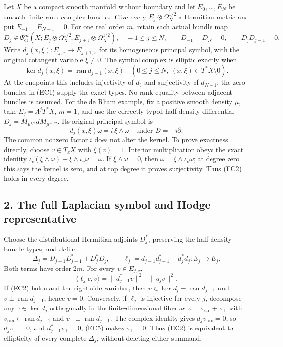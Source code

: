 \documentclass[
  11pt,
]{article}
\begin{document}
Let \(X\) be a compact smooth manifold without boundary and let
\(E_0,\ldots,E_N\) be smooth finite-rank complex bundles. Give every
\(E_j\otimes\Omega_X^{1/2}\) a Hermitian metric and put
\(E_{-1}=E_{N+1}=0\). For one real order \(m\), retain each actual
bundle map \[
 D_j\in\Psi^m_{\mathrm{cl}}
   (X;E_j\otimes\Omega_X^{1/2},E_{j+1}\otimes\Omega_X^{1/2}),
 \quad -1\le j\le N,\qquad
 D_{-1}=D_N=0,\qquad D_jD_{j-1}=0.
 \tag{EC1}
\] Write \(d_j(x,\xi):E_{j,x}\to E_{j+1,x}\) for its homogeneous
principal symbol, with the original cotangent variable \(\xi\ne0\). The
symbol complex is elliptic exactly when \[
 \ker d_j(x,\xi)=\operatorname{ran}d_{j-1}(x,\xi)
 \quad(0\le j\le N,\ (x,\xi)\in T^*X\setminus0).
 \tag{EC2}
\] At the endpoints this includes injectivity of \(d_0\) and
surjectivity of \(d_{N-1}\); the zero bundles in (EC1) supply the exact
types. No rank equality between adjacent bundles is assumed. For the de
Rham example, fix a positive smooth density \(\mu\), take
\(E_j=\Lambda^jT^*X\), \(m=1\), and use the correctly typed half-density
differential \(D_j=M_{\mu^{1/2}}dM_{\mu^{-1/2}}\). Its original
principal symbol is \[
 d_j(x,\xi)\omega=i\,\xi\wedge\omega
 \quad\text{under }D=-i\partial.
 \tag{EC3}
\] The common nonzero factor \(i\) does not alter the kernel. To prove
exactness directly, choose \(v\in T_xX\) with \(\xi(v)=1\). Interior
multiplication obeys the exact identity
\(\iota_v(\xi\wedge\omega)+\xi\wedge\iota_v\omega=\omega\). If
\(\xi\wedge\omega=0\), then \(\omega=\xi\wedge\iota_v\omega\); at degree
zero this says the kernel is zero, and at top degree it proves
surjectivity. Thus (EC2) holds in every degree.

\subsection{2. The full Laplacian symbol and Hodge
representative}\label{the-full-laplacian-symbol-and-hodge-representative}

Choose the distributional Hermitian adjoints \(D_j^*\), preserving the
half-density bundle types, and define \[
 \Delta_j=D_{j-1}D_{j-1}^*+D_j^*D_j,\qquad
 \ell_j=d_{j-1}d_{j-1}^*+d_j^*d_j
       :E_j\longrightarrow E_j.
 \tag{EC4}
\] Both terms have order \(2m\). For every \(v\in E_{j,x}\), \[
 \langle\ell_jv,v\rangle
   =\|d_{j-1}^*v\|^2+\|d_jv\|^2.
 \tag{EC5}
\] If (EC2) holds and the right side vanishes, then \(v\in\ker d_j
=\operatorname{ran}d_{j-1}\) and \(v\perp\operatorname{ran}d_{j-1}\),
hence \(v=0\). Conversely, if \(\ell_j\) is injective for every \(j\),
decompose any \(v\in\ker d_j\) orthogonally in the finite-dimensional
fiber as \(v=v_{\mathrm{ran}}+v_\perp\) with
\(v_{\mathrm{ran}}\in\operatorname{ran}d_{j-1}\) and
\(v_\perp\perp\operatorname{ran}d_{j-1}\). The complex identity gives
\(d_jv_{\mathrm{ran}}=0\), so \(d_jv_\perp=0\), and
\(d_{j-1}^*v_\perp=0\); (EC5) makes \(v_\perp=0\). Thus (EC2) is
equivalent to ellipticity of every complete \(\Delta_j\), without
deleting either summand.
\end{document}
